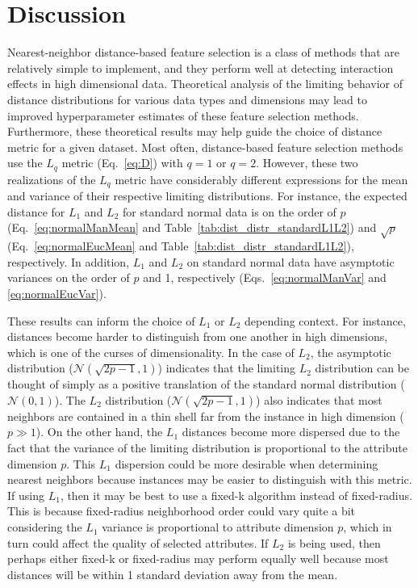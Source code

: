 \documentclass[aos]{imsart}
\begin{document}
\section{Discussion}\label{sec:discussion}

Nearest-neighbor distance-based feature selection is a class of methods that are relatively simple to implement, and they perform well at detecting interaction effects in high dimensional data. Theoretical analysis of the limiting behavior of distance distributions for various data types and dimensions may lead to improved hyperparameter estimates of these feature selection methods. Furthermore, these theoretical results may help guide the choice of distance metric for a given dataset. Most often, distance-based feature selection methods use the $L_q$ metric (Eq.~\ref{eq:D}) with $q=1$ or $q=2$. However, these two realizations of the $L_q$ metric have considerably different expressions for the mean and variance of their respective limiting distributions. For instance, the expected distance for $L_1$ and $L_2$ for standard normal data is on the order of $p$ (Eq.~\ref{eq:normalManMean} and Table~\ref{tab:dist_distr_standardL1L2}) and $\sqrt{p}$ (Eq.~\ref{eq:normalEucMean} and Table~\ref{tab:dist_distr_standardL1L2}), respectively. In addition, $L_1$ and $L_2$ on standard normal data have asymptotic variances on the order of $p$ and 1, respectively (Eqs.~\ref{eq:normalManVar} and \ref{eq:normalEucVar}). 

These results can inform the choice of $L_1$ or $L_2$ depending context. For instance, distances become harder to distinguish from one another in high dimensions, which is one of the curses of dimensionality. In the case of $L_2$, the asymptotic distribution ($\mathcal{N}(\sqrt{2p - 1},1)$) indicates that the limiting $L_2$ distribution can be thought of simply as a positive translation of the standard normal distribution ($\mathcal{N}(0,1)$). The $L_2$ distribution ($\mathcal{N}(\sqrt{2p - 1},1)$) also indicates that most neighbors are contained in a thin shell far from the instance in high dimension ($p \gg 1$). On the other hand, the $L_1$ distances become more dispersed due to the fact that the variance of the limiting distribution is proportional to the attribute dimension $p$. This $L_1$ dispersion could be more desirable when determining nearest neighbors because instances may be easier to distinguish with this metric. If using $L_1$, then it may be best to use a fixed-k algorithm instead of fixed-radius. This is because fixed-radius neighborhood order could vary quite a bit considering the $L_1$ variance is proportional to attribute dimension $p$, which in turn could affect the quality of selected attributes. If $L_2$ is being used, then perhaps either fixed-k or fixed-radius may perform equally well because most distances will be within 1 standard deviation away from the mean. 
\end{document}
